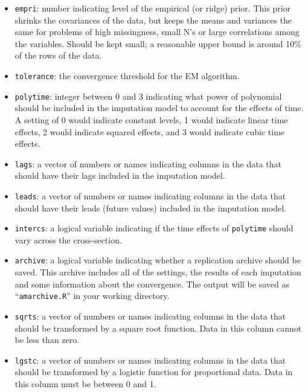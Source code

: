 \documentclass[12pt,titlepage]{article}
\begin{document}
\begin{itemize}
      \item \texttt{empri}: number indicating level of the empirical (or ridge)
        prior.  This prior shrinks the covariances of the data, but keeps the
        means and variances the same for problems of high missingness, small N's
        or large correlations among the variables.  Should be kept small; a
        reasonable upper bound is around 10\% of the rows of the data.
  
      \item \texttt{tolerance}: the convergence threshold for the EM algorithm.
  
      \item \texttt{polytime}: integer between 0 and 3 indicating what
        power of polynomial should be included in the imputation model
        to account for the effects of time.  A setting of 0 would
        indicate constant levels, 1 would indicate linear time
        effects, 2 would indicate squared effects, and 3 would
        indicate cubic time effects.
  
      \item \texttt{lags}: a vector of numbers or names indicating
        columns in the data that should have their lags included in
        the imputation model.
  
      \item \texttt{leads}: a vector of numbers or names indicating
        columns in the data that should have their leads (future
        values) included in the imputation model.
    
      \item \texttt{intercs}: a logical variable indicating if the
        time effects of \texttt{polytime} should vary across the
        cross-section.
  
      \item \texttt{archive}: a logical variable indicating whether a
        replication archive should be saved.  This archive includes
        all of the settings, the results of each imputation and some
        information about the convergence.  The output will be saved
        as ``\texttt{amarchive.R}'' in your working directory.
    
      \item \texttt{sqrts}: a vector of numbers or names indicating
        columns in the data that should be transformed by a square
        root function.  Data in this column cannot be less than zero.
  
      \item \texttt{lgstc}: a vector of numbers or names indicating
        columns in the data that should be transformed by a logistic
        function for proportional data.  Data in this column must be
        between 0 and 1.
      

\end{itemize}
\end{document}
